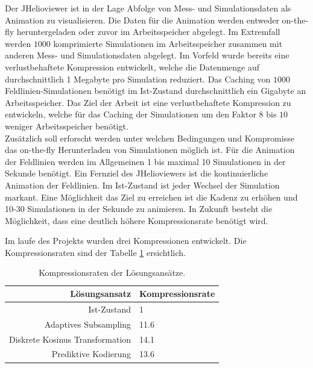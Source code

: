 Der JHelioviewer ist in der Lage Abfolge von Mess- und Simulationsdaten als Animation zu visualisieren. Die Daten für die Animation werden entweder on-the-fly heruntergeladen oder zuvor im Arbeitsspeicher abgelegt. Im Extremfall werden $1000$ komprimierte Simulationen im Arbeitsspeicher zusammen mit anderen Mess- und Simulationsdaten abgelegt. Im Vorfeld wurde bereits eine verlustbehaftete Kompression entwickelt, welche die Datenmenge auf durchschnittlich 1 Megabyte pro Simulation reduziert. Das Caching von $1000$ Feldlinien-Simulationen benötigt im Ist-Zustand durchschnittlich ein Gigabyte an Arbeitsspeicher. Das Ziel der Arbeit ist eine verlustbehaftete Kompression zu entwickeln, welche für das Caching der Simulationen um den Faktor $8$ bis $10$ weniger Arbeitsspeicher benötigt.\\
Zusätzlich soll erforscht werden unter welchen Bedingungen und Kompromisse das on-the-fly Herunterladen von Simulationen möglich ist. Für die Animation der Feldlinien werden im Allgemeinen 1 bis maximal 10 Simulationen in der Sekunde benötigt. Ein Fernziel des JHelioviewers ist die kontinuierliche Animation der Feldlinien. Im Ist-Zustand ist jeder Wechsel der Simulation markant. Eine Möglichkeit das Ziel zu erreichen ist die Kadenz zu erhöhen und 10-30 Simulationen in der Sekunde zu animieren. In Zukunft besteht die Möglichkeit, dass eine deutlich höhere Kompressionsrate benötigt wird.

Im laufe des Projekts wurden drei Kompressionen entwickelt. Die Kompressionsraten sind der Tabelle \ref{einleitung:tabelle} ersichtlich.
\begin{table}[!htbp]
	\center
	\begin{tabular}{r|l}
		Lösungsansatz & Kompressionsrate \\\hline
		Ist-Zustand & 1\\
		Adaptives Subsampling & 11.6 \\
		Diskrete Kosinus Transformation & 14.1 \\
		Prediktive Kodierung & 13.6\\
	\end{tabular}
	\caption{Kompressionsraten der Lösungsansätze.}
	\label{einleitung:tabelle}
\end{table}